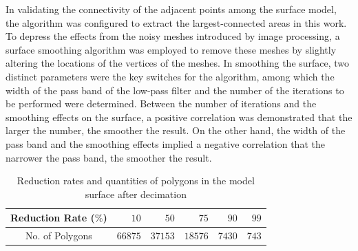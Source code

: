 In validating the connectivity of the adjacent points among the surface model, the algorithm was configured to extract the largest-connected areas in this work.
To depress the effects from the noisy meshes introduced by image processing, a surface smoothing algorithm was employed to remove these meshes by slightly altering the locations of the vertices of the meshes. %
In smoothing the surface, two distinct parameters were the key switches for the algorithm, among which the width of the pass band of the low-pass filter and the number of the iterations to be performed were determined. %
Between the number of iterations and the smoothing effects on the surface, a positive correlation was demonstrated that the larger the number, the smoother the result.
On the other hand, the width of the pass band and the smoothing effects implied a negative correlation that the narrower the pass band, the smoother the result.
\begin{table}[t]
\renewcommand{\arraystretch}{1.3}
\caption{Reduction rates and quantities of polygons in the model surface after decimation}
\label{tbl:Decimate}
\centering
\begin{tabular}{c||r r r r r}
\hline
Reduction Rate ($\%$)  &    $10$ &    $50$ &    $75$ &   $90$ &  $99$ \\
\hline\hline
No. of Polygons & $66875$ & $37153$ & $18576$ & $7430$ & $743$ \\
\hline
\end{tabular}
\end{table}

